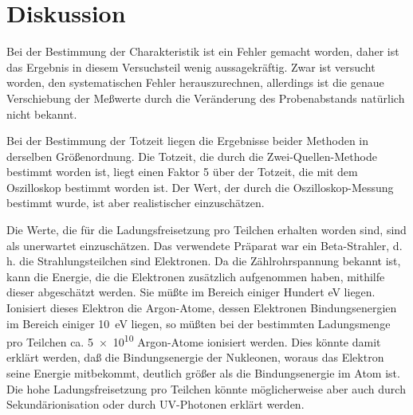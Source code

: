 
\section{Diskussion}

Bei der Bestimmung der Charakteristik ist ein Fehler gemacht worden,
daher ist das Ergebnis in diesem Versuchsteil wenig aussagekräftig. Zwar
ist versucht worden, den systematischen Fehler herauszurechnen,
allerdings ist die genaue Verschiebung der Meßwerte durch die
Veränderung des Probenabstands natürlich nicht bekannt.

Bei der Bestimmung der Totzeit liegen die Ergebnisse beider Methoden in
derselben Größenordnung. Die Totzeit, die durch die Zwei-Quellen-Methode
bestimmt worden ist, liegt einen Faktor 5 über der Totzeit, die mit dem
Oszilloskop bestimmt worden ist. Der Wert, der durch die
Oszilloskop-Messung bestimmt wurde, ist aber realistischer
einzuschätzen.

Die Werte, die für die Ladungsfreisetzung pro Teilchen erhalten worden
sind, sind als unerwartet einzuschätzen.  Das verwendete Präparat war
ein Beta-Strahler, d.\,h. die Strahlungsteilchen sind Elektronen.  Da
die Zählrohrspannung bekannt ist, kann die Energie, die die Elektronen
zusätzlich aufgenommen haben, mithilfe dieser abgeschätzt werden.  Sie
müßte im Bereich einiger Hundert \si{\electronvolt} liegen.  Ionisiert
dieses Elektron die Argon-Atome, dessen Elektronen Bindungsenergien im
Bereich einiger \SI{10}{\electronvolt} liegen, so müßten bei der
bestimmten Ladungsmenge pro Teilchen ca. \num{5e10} Argon-Atome
ionisiert werden. Dies könnte damit erklärt werden, daß die
Bindungsenergie der Nukleonen, woraus das Elektron seine Energie
mitbekommt, deutlich größer als die Bindungsenergie im Atom ist.  Die
hohe Ladungsfreisetzung pro Teilchen könnte möglicherweise aber auch
durch Sekundärionisation oder durch UV-Photonen erklärt werden.
